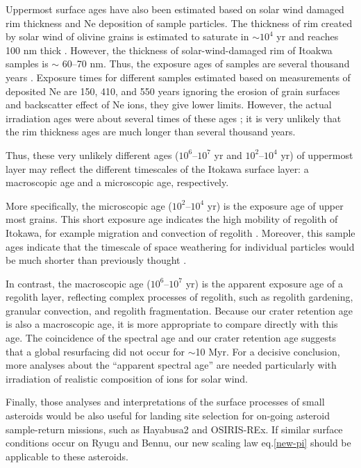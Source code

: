 \documentclass[3p,authoryear]{elsarticle}
\begin{document}
Uppermost surface ages have also been estimated based on solar wind damaged rim thickness and Ne deposition of sample particles. The thickness of rim created by solar wind of olivine grains is estimated to saturate in $\sim 10^4$ yr and reaches 100 nm thick \citep{keller2016}. However, the thickness of solar-wind-damaged rim of Itoakwa samples is $\sim$ 60--70 nm. Thus, the exposure ages of samples are several thousand years \citep{berger2015}. Exposure times for different samples estimated based on measurements of deposited Ne are 150, 410, and 550 years ignoring the erosion of grain surfaces and backscatter effect of Ne ions, they give lower limits. However, the actual irradiation ages were about several times of these ages \citep{nagao2011}; it is very unlikely that the rim thickness ages are much longer than several thousand years.

Thus, these very unlikely different ages ($10^6$--$10^7$ yr and $10^2$--$10^4$ yr) of uppermost layer may reflect the different timescales of the Itokawa surface layer: a macroscopic age and a microscopic age, respectively.

More specifically, the microscopic age ($10^2$--$10^4$ yr) is the exposure age of upper most grains. This short exposure age indicates the high mobility of regolith of Itokawa, for example migration and convection of regolith \citep[e.g.,][]{miyamoto2007}. Moreover, this sample ages indicate that the timescale of space weathering for individual particles would be much shorter than previously thought \citep{strazzulla2005}.

In contrast, the macroscopic age ($10^6$--$10^7$ yr) is the apparent exposure age of a regolith layer, reflecting complex processes of regolith, such as regolith gardening, granular convection, and regolith fragmentation. Because our crater retention age is also a macroscopic age, it is more appropriate to compare directly with this age. The coincidence of the spectral age and our crater retention age suggests that a global resurfacing did not occur for $\sim$10 Myr. For a decisive conclusion, more analyses about the ``apparent spectral age'' are needed particularly with irradiation of realistic composition of ions for solar wind. 

Finally, those analyses and interpretations of the surface processes of small asteroids would be also useful for landing site selection for on-going asteroid sample-return missions, such as Hayabusa2 and OSIRIS-REx.
If similar surface conditions occur on Ryugu and Bennu, our new scaling law eq.\eqref{new-pi} should be applicable to these asteroids. 
\end{document}
